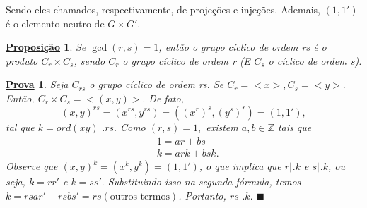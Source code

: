 \documentclass{article}
\newtheorem*{prop*}{\underline{Proposi\c c\~ao}}
\newtheorem*{proof*}{\underline{Prova}}
\renewcommand\qedsymbol{$\blacksquare$}
\begin{document}
 Sendo eles chamados, respectivamente, de proje\c c\~oes e inje\c c\~oes. Ademais, $(1, 1')$ \'e o elemento neutro de $G\times{G'}.$
 \begin{prop*}
   Se $\gcd{(r, s)} = 1$, ent\~ao o grupo c\'iclico de ordem rs \'e o produto $C_{r}\times{C_{s}}$, sendo $C_{r}$ o grupo
 c\'iclico de ordem r (E $C_{s}$ o c\'iclico de ordem s).
 \end{prop*}
\begin{proof*}
  Seja $C_{rs}$ o grupo c\'iclico de ordem rs. Se $C_{r}=<x>, C_{s} = <y>.$ Ent\~ao, $C_{r}\times{C_{s}} = <(x, y)>.$ De fato, 
    $$
    (x, y)^{rs} = (x^{rs}, y^{rs}) = ((x^{r})^{s}, (y^{s})^{r}) = (1, 1'),
    $$
  tal que $k = ord(xy)\biggl|_{}^{}\biggr.rs.$ Como $(r, s) = 1,$ existem $a, b\in \mathbb{Z}$ tais que 
   \begin{align*}
     &1 = ar + bs\\
     &k = ark + bsk.
   \end{align*}
  Observe que $(x, y)^{k} = (x^{k}, y^{k}) = (1, 1')$, o que implica que $r \biggl|_{}^{}\biggr.k$ e $s \biggl|_{}^{}\biggr.k$, ou seja,
  $k = rr'$ e $k = ss'.$ Substituindo isso na segunda f\'ormula, temos $k = rsar' + rsbs' = rs(\text{outros termos})$. Portanto,
  $rs \biggl|_{}^{}\biggr.k.$ \qedsymbol
\end{proof*}
\end{document}

